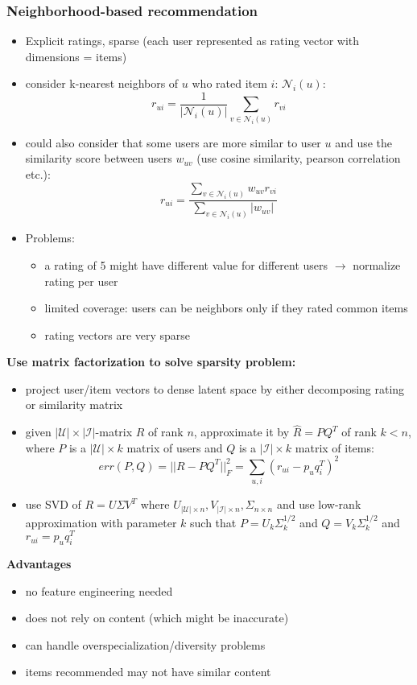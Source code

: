 \subsubsection{Neighborhood-based recommendation}
\begin{itemize}
    \item Explicit ratings, sparse (each user represented as rating vector with dimensions = items)
    \item consider k-nearest neighbors of $u$ who rated item $i$: $\mathcal{N}_i(u)$:
    $$r_{ui} = \dfrac{1}{|\mathcal{N}_i(u)|} \sum_{v \in \mathcal{N}_i(u)}r_{vi}$$
    \item could also consider that some users are more similar to user $u$ and use the similarity score between users $w_{uv}$ (use cosine similarity, pearson correlation etc.):
    $$ r_{ui} = \dfrac{\sum_{v \in \mathcal{N}_i(u)}w_{uv}r_{vi}}{\sum_{v \in \mathcal{N}_i(u)} |w_{uv}|}$$
    \item Problems:
    \begin{itemize}
        \item a rating of 5 might have different value for different users $\rightarrow$ normalize rating per user
        \item limited coverage: users can be neighbors only if they rated common items
        \item rating vectors are very sparse
    \end{itemize}
\end{itemize}
\textbf{Use matrix factorization to solve sparsity problem:}
\begin{itemize}
    \item project user/item vectors to dense latent space by either decomposing rating or similarity matrix
    \item given $|\mathcal{U}| \times |\mathcal{I}|$-matrix $R$ of rank $n$, approximate it by $\hat{R}=PQ^T$ of rank $k<n$, where $P$ is a $|\mathcal{U}| \times k$ matrix of users and $Q$ is a $|\mathcal{I}| \times k$ matrix of items:
    $$ err(P,Q) = ||R - PQ^T||^2_F = \sum_{u,i} (r_{ui} - p_uq_i^T)^2 $$
    \item use SVD of $R = U \Sigma V^T$ where $U_{|\mathcal{U}| \times n}, V_{|\mathcal{I}| \times n}, \Sigma_{n \times n}$ and use low-rank approximation with parameter $k$ such that $P = U_k \Sigma_k^{1/2}$ and $Q = V_k \Sigma_k^{1/2}$ and $r_{ui} = p_u q_i^T$
\end{itemize}
\textbf{Advantages}
\begin{itemize}
    \item no feature engineering needed
    \item does not rely on content (which might be inaccurate)
    \item can handle overspecialization/diversity problems
    \item items recommended may not have similar content
\end{itemize}
